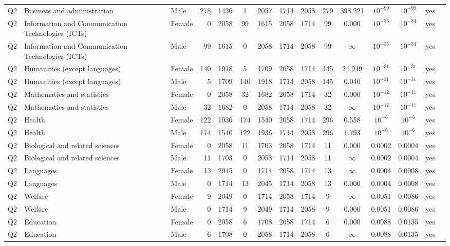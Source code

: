 \begin{longtable}{lllrcccccccccll}
Q2 & Business and administration & Male & 278 & 1436 & 1 & 2057 & 1714 & 2058 & 279 & 398.221 & $10^{-99}$ & $10^{-99}$ & yes \\
Q2 & Information and Communication Technologies (ICTs) & Female & 0 & 2058 & 99 & 1615 & 2058 & 1714 & 99 & 0.000 & $10^{-35}$ & $10^{-34}$ & yes \\
Q2 & Information and Communication Technologies (ICTs) & Male & 99 & 1615 & 0 & 2058 & 1714 & 2058 & 99 & $\infty$ & $10^{-35}$ & $10^{-34}$ & yes \\
Q2 & Humanities (except languages) & Female & 140 & 1918 & 5 & 1709 & 2058 & 1714 & 145 & 24.949 & $10^{-31}$ & $10^{-31}$ & yes \\
Q2 & Humanities (except languages) & Male & 5 & 1709 & 140 & 1918 & 1714 & 2058 & 145 & 0.040 & $10^{-31}$ & $10^{-31}$ & yes \\
Q2 & Mathematics and statistics & Female & 0 & 2058 & 32 & 1682 & 2058 & 1714 & 32 & 0.000 & $10^{-12}$ & $10^{-11}$ & yes \\
Q2 & Mathematics and statistics & Male & 32 & 1682 & 0 & 2058 & 1714 & 2058 & 32 & $\infty$ & $10^{-12}$ & $10^{-11}$ & yes \\
Q2 & Health & Female & 122 & 1936 & 174 & 1540 & 2058 & 1714 & 296 & 0.558 & $10^{-6}$ & $10^{-6}$ & yes \\
Q2 & Health & Male & 174 & 1540 & 122 & 1936 & 1714 & 2058 & 296 & 1.793 & $10^{-6}$ & $10^{-6}$ & yes \\
Q2 & Biological and related sciences & Female & 0 & 2058 & 11 & 1703 & 2058 & 1714 & 11 & 0.000 & 0.0002 & 0.0004 & yes \\
Q2 & Biological and related sciences & Male & 11 & 1703 & 0 & 2058 & 1714 & 2058 & 11 & $\infty$ & 0.0002 & 0.0004 & yes \\
Q2 & Languages & Female & 13 & 2045 & 0 & 1714 & 2058 & 1714 & 13 & $\infty$ & 0.0004 & 0.0008 & yes \\
Q2 & Languages & Male & 0 & 1714 & 13 & 2045 & 1714 & 2058 & 13 & 0.000 & 0.0004 & 0.0008 & yes \\
Q2 & Welfare & Female & 9 & 2049 & 0 & 1714 & 2058 & 1714 & 9 & $\infty$ & 0.0051 & 0.0086 & yes \\
Q2 & Welfare & Male & 0 & 1714 & 9 & 2049 & 1714 & 2058 & 9 & 0.000 & 0.0051 & 0.0086 & yes \\
Q2 & Education & Female & 0 & 2058 & 6 & 1708 & 2058 & 1714 & 6 & 0.000 & 0.0088 & 0.0135 & yes \\
Q2 & Education & Male & 6 & 1708 & 0 & 2058 & 1714 & 2058 & 6 & $\infty$ & 0.0088 & 0.0135 & yes \\

\end{longtable}

